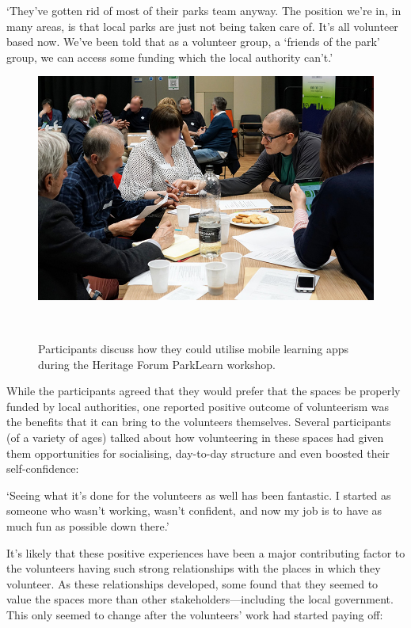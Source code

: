 \begin{displayquote}
`They've gotten rid of most of their parks team anyway. The position we're in, in many areas, is that local parks are just not being taken care of. It's all volunteer based now. We've been told that as a volunteer group, a `friends of the park' group, we can access some funding which the local authority can't.'
\end{displayquote}

\begin{figure}
  \centering
  \includegraphics[width=0.9\columnwidth]{images/chapter06/HF_Workshop.jpg}
  \caption[The Heritage Forum ParkLearn workshop]{Participants discuss how they could utilise mobile learning apps during the Heritage Forum ParkLearn workshop.}~\label{fig:ParkLearnWorkshop}
\end{figure}

While the participants agreed that they would prefer that the spaces be properly funded by local authorities, one reported positive outcome of volunteerism was the benefits that it can bring to the volunteers themselves. Several participants (of a variety of ages) talked about how volunteering in these spaces had given them opportunities for socialising, day-to-day structure and even boosted their self-confidence:

\begin{displayquote}
`Seeing what it's done for the volunteers as well has been fantastic. I started as someone who wasn't working, wasn't confident, and now my job is to have as much fun as possible down there.' 
\end{displayquote}

It's likely that these positive experiences have been a major contributing factor to the volunteers having such strong relationships with the places in which they volunteer. As these relationships developed, some found that they seemed to value the spaces more than other stakeholders---including the local government. This only seemed to change after the volunteers' work had started paying off:

